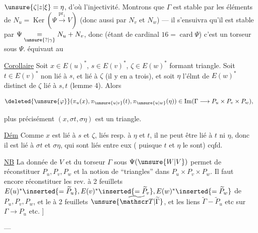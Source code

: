 
$\unsure{\zeta|z|\xi}=\eta$, d'où l'injectivité. Montrons que $\Gamma$ est stable par les éléments de $N_u=\operatorname{Ker}(\Psi\xrightarrow{\mathrm{pr}_1}V)$ (donc aussi par $N_v$ et $N_w$) --- il s'ensuivra qu'il est stable par $\Psi\underset{\unsure{?|\gamma}}{=}N_u+N_v$, donc (étant de cardinal $16=\operatorname{card}\Psi$) c'est un torseur sous $\Psi$.  équivaut au

\uline{Corollaire} Soit $x\in E(u)^*$, $s\in E(v)^*$, $\zeta\in E(w)^*$ formant triangle.  Soit  $t\in E(v)^*$  non lié à $s$, et lié à $\zeta$ (il y en a trois), et soit $\eta$ l'élmt de $E(w)^*$ distinct de $\zeta$ lié à $s,t$ (lemme 4). Alors

\[
\deleted{\unsure{\varphi}}(\pi_u(x),\pi_{\unsure{u|v}}(t),\pi_{\unsure{u|w}}(\eta))\in\operatorname{Im}(\Gamma\longrightarrow P_u\times P_v\times P_w),
\]

  plus précisément $(x,\sigma t,\sigma\eta)$ est un triangle.


\uline{Dém} Comme $x$ est lié à $s$ et $\zeta$, liés resp. à $\eta$ et $t$, il ne peut être lié à $t$ ni $\eta$, donc il est lié à $\sigma t$ et $\sigma\eta$, qui sont liés entre eux ( puisque $t$ et $\eta$ le sont) cqfd.


\uline{NB} La donnée de $V$ et du torseur $\Gamma$ sous $\Psi(\unsure{W|V})$ permet de réconstituer $P_u,P_v,P_w$ et la notion de ``triangles'' dans $P_u\times P_v\times P_w$. Il faut encore réconstituer les rev. à 2 feuillets $E(u)^*\inserted{=\widetilde P_u},E(v)^*\inserted{=\widetilde P_v},E(w)^*\inserted{=\widetilde P_w}$ de $P_u,P_v,P_w$, et le  à 2 feuillets $\unsure{\widetilde{\mathscr T}|\widetilde\Gamma}$, et les liens $\widetilde\Gamma\mathbin{-}\widetilde P_u$ etc sur $\Gamma\to P_u$ etc. $\big]$

\noindent ---

